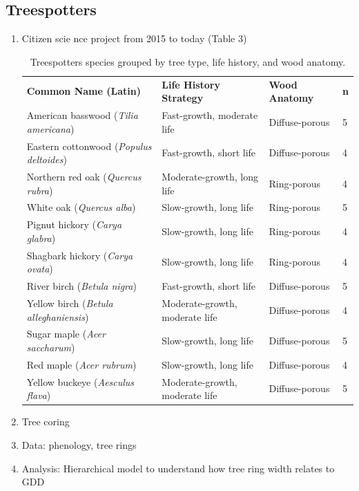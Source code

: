 \documentclass{article}
\begin{document}
\subsection{Treespotters}
\begin {enumerate}
	\item Citizen scie nce project from 2015 to today (Table 3)
\begin{table}[h]
\centering
\caption{Treespotters species grouped by tree type, life history, and wood anatomy.}
\begin{tabular}{|>{\raggedright\arraybackslash}p{7cm}|p{5cm}|p{3cm}|p{1cm}|}
\hline
\multicolumn{4}{|c|}{\textbf{Deciduous Trees}} \\
\hline
\textbf{Common Name (Latin)} & \textbf{Life History Strategy} & \textbf{Wood Anatomy} & \textbf{n} \\
\hline
American basswood (\textit{Tilia americana}) & Fast-growth, moderate life & Diffuse-porous & 5\\
Eastern cottonwood (\textit{Populus deltoides}) & Fast-growth, short life & Diffuse-porous & 4\\
Northern red oak (\textit{Quercus rubra}) & Moderate-growth, long life & Ring-porous & 4\\
White oak (\textit{Quercus alba}) & Slow-growth, long life & Ring-porous & 5\\
Pignut hickory (\textit{Carya glabra}) & Slow-growth, long life & Ring-porous & 4\\
Shagbark hickory (\textit{Carya ovata}) & Slow-growth, long life & Ring-porous & 4\\
River birch (\textit{Betula nigra}) & Fast-growth, short life & Diffuse-porous & 5\\
Yellow birch (\textit{Betula alleghaniensis}) & Moderate-growth, moderate life & Diffuse-porous & 4\\
Sugar maple (\textit{Acer saccharum}) & Slow-growth, long life & Diffuse-porous & 5\\
Red maple (\textit{Acer rubrum}) & Slow-growth, long life & Diffuse-porous & 4\\
Yellow buckeye (\textit{Aesculus flava}) & Moderate-growth, moderate life & Diffuse-porous & 5\\
\hline
\end{tabular}
\end{table}

	\item Tree coring
	\item Data: phenology, tree rings
	\item Analysis: Hierarchical model to understand how tree ring width relates to GDD	
\end {enumerate}
\end{document}
